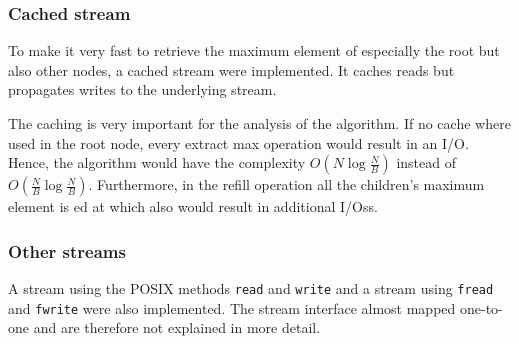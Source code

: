 
\subsubsection{Cached stream}

To make it very fast to retrieve the maximum element of especially the root but also other nodes, a cached stream were implemented. It caches reads but propagates writes to the underlying stream.

The caching is very important for the analysis of the algorithm. If no cache where used in the root node, every extract max operation would result in an I/O. Hence, the algorithm would have the complexity $O(N\log \frac{N}{B})$ instead of $O(\frac{N}{B}\log \frac{N}{B})$. Furthermore, in the refill operation all the children's maximum element is ed at which also would result in additional I/Oss.

\subsubsection{Other streams}

A stream using the POSIX methods \texttt{read} and \texttt{write} and a stream using \texttt{fread} and \texttt{fwrite} were also implemented. The stream interface almost mapped one-to-one and are therefore not explained in more detail.